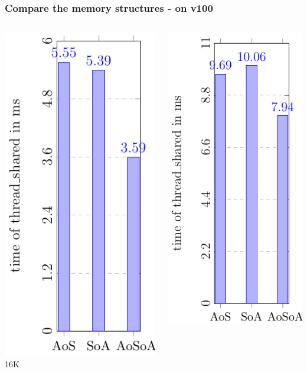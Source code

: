 \documentclass[aspectratio=169]{beamer}
\begin{document}
\begin{frame}
	\frametitle{Compare the memory structures - on v100}
	\begin{columns}
	\begin{column}{0.25\textwidth}
	\includegraphics[scale=0.55]{figures/fig10.pdf}
	\small 16K
	\end{column}
	\begin{column}{0.25\textwidth}
	\includegraphics[scale=0.55]{figures/fig20.pdf}

\end{column}
\end{columns}
\end{frame}
\end{document}
